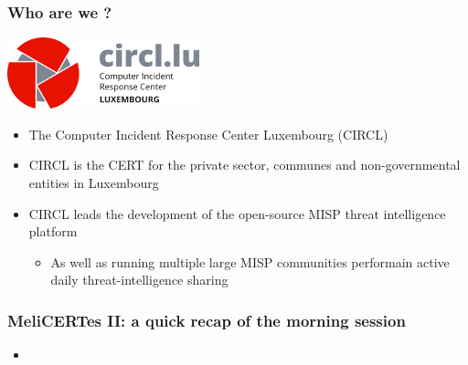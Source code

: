 
\begin{frame}[t,plain]
\titlepage
\end{frame}


\begin{frame}
\frametitle{Who are we ?}
    \begin{center}
        \includegraphics[width=0.3\linewidth]{pictures/circl.png}
    \end{center}
    \begin{itemize}
        \item The Computer Incident Response Center Luxembourg (CIRCL)
        \item CIRCL is the CERT for the private sector, communes and non-governmental entities in Luxembourg
        \item CIRCL leads the development of the open-source MISP threat intelligence platform
        \begin{itemize}
            \item As well as running multiple large MISP communities performain active daily threat-intelligence sharing
        \end{itemize}
    \end{itemize}
\end{frame}

\begin{frame}
\frametitle{MeliCERTes II: a quick recap of the morning session}
    \begin{itemize}
        \item {}
    \end{itemize}
\end{frame}

